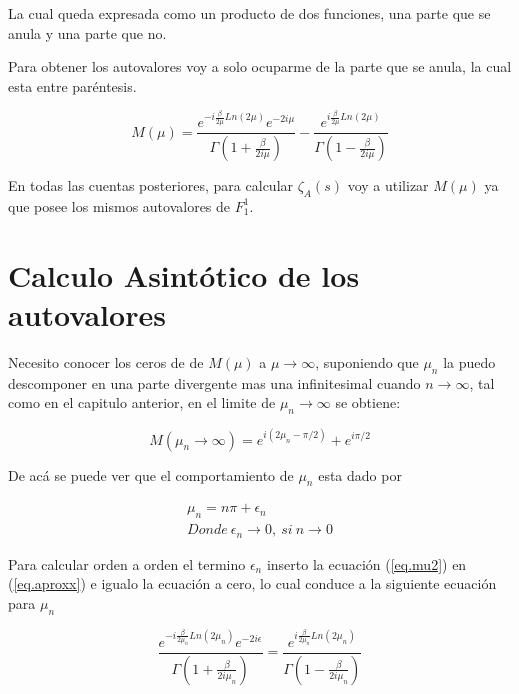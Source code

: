 La cual queda expresada como un producto de dos funciones, una parte que se anula y una parte que no.

Para obtener los autovalores voy a solo ocuparme de la parte que se anula, la cual esta entre paréntesis.

\begin{equation}
    M (\mu) = 
    \frac{e ^{- i \frac{\beta}{2 \mu} Ln(2 \mu) } e ^{-2 i \mu} }{\Gamma(1+\frac{ \beta}{2 i \mu})} - 
    \frac{e ^{  i \frac{\beta}{2 \mu} Ln(2 \mu) }}               {\Gamma(1-\frac{ \beta}{2 i \mu})}
\label{eq.aproxx}
\end{equation}

En todas las cuentas posteriores, para calcular $\zeta _A (s)$ voy a utilizar $M ( \mu )$ ya que posee los mismos autovalores de $ F _1 ^1 $.



\section{Calculo Asintótico de los autovalores}

Necesito conocer los ceros de  de $M(\mu)$ a $\mu \rightarrow{\infty}$, suponiendo que $\mu _n$ la puedo descomponer en una parte divergente mas una infinitesimal cuando $n \rightarrow{\infty}$, tal como en el capitulo anterior,
 en el limite de $\mu _n \rightarrow \infty$ se obtiene:

\begin{equation}
    M(\mu _n \rightarrow \infty) = 
    e ^{i (2 \mu _n - \pi /2)} + e^{i \pi/2}
\end{equation}

De acá se puede ver que el comportamiento de $\mu _n$ esta dado por 


\begin{equation}
\begin{array}{c}
    \mu _n = n \pi + \epsilon _n \\
    Donde \ \epsilon _n \rightarrow{0} ,\ si \ n \rightarrow{0}
\end{array}
\label{eq.mu2}
\end{equation}



Para calcular orden a orden el termino $\epsilon _n$ inserto la ecuación (\ref{eq.mu2}) en (\ref{eq.aproxx}) e igualo la ecuación a cero, lo cual conduce a la siguiente ecuación para $\mu _n$

\begin{equation}
    \frac{e ^{- i \frac{\beta}{2 \mu _n} Ln(2 \mu _n)} e ^{-2 i \epsilon} }
    {\Gamma(1 + \frac{ \beta}{2 i \mu _n})} =
    \frac{e ^{ i \frac{\beta}{2 \mu _n} Ln(2 \mu _n)} 
    } {\Gamma(1-\frac{ \beta}{2 i \mu _n})}
\end{equation}

